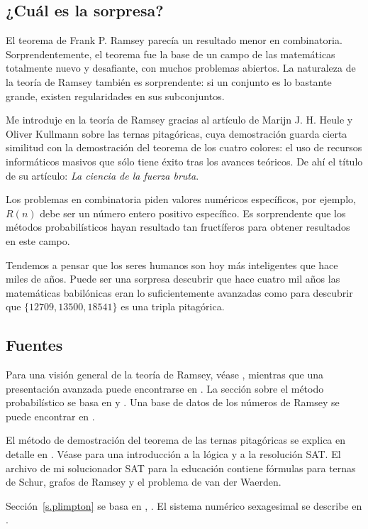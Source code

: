 
\subsection*{¿Cuál es la sorpresa?}

El teorema de Frank P. Ramsey  parecía un resultado menor en combinatoria. Sorprendentemente, el teorema fue la base de un campo de las matemáticas totalmente nuevo y desafiante, con muchos problemas abiertos. La naturaleza de la teoría de Ramsey también es sorprendente: si un conjunto es lo bastante grande, existen regularidades en sus subconjuntos.

Me introduje en la teoría de Ramsey gracias al artículo de Marijn J. H. Heule y Oliver Kullmann sobre las ternas pitagóricas, cuya demostración guarda cierta similitud con la demostración del teorema de los cuatro colores: el uso de recursos informáticos masivos que sólo tiene éxito tras los avances teóricos. De ahí el título de su artículo: \textit{La ciencia de la fuerza bruta}.

Los problemas en combinatoria piden valores numéricos específicos, por ejemplo, $R(n)$ debe ser un número entero positivo específico. Es sorprendente que los métodos probabilísticos hayan resultado tan fructíferos para obtener resultados en este campo.

Tendemos a pensar que los seres humanos son hoy más inteligentes que hace miles de años. Puede ser una sorpresa descubrir que hace cuatro mil años las matemáticas babilónicas eran lo suficientemente avanzadas como para descubrir que $\{12709, 13500, 18541\}$ es una tripla pitagórica.

\subsection*{Fuentes}

Para una visión general de la teoría de Ramsey, véase \cite{burton}, mientras que una presentación avanzada puede encontrarse en \cite{rudiments}. La sección sobre el método probabilístico se basa en \cite[Ejemplo~4o]{ross} y \cite[Capítulo~4]{burton}. Una base de datos de los números de Ramsey se puede encontrar en \cite{mckay}.

El método de demostración del teorema de las ternas pitagóricas se explica en detalle en \cite{brute}. Véase \cite{mlcs} para una introducción a la lógica y a la resolución SAT. El archivo de mi solucionador SAT para la educación \cite{joss} contiene fórmulas para ternas de Schur, grafos de Ramsey y el problema de van der Waerden. 

Sección~\ref{s.plimpton} se basa en \cite{wiki:plimpton}, \cite{robson}. 
El sistema numérico sexagesimal se describe en \cite{wiki:sexagesimal}.
